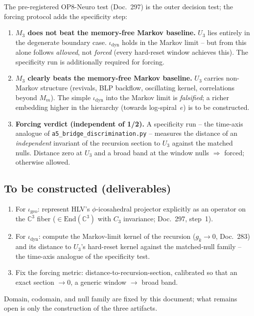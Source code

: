 The pre-registered OP8-Neuro test (Doc.~297) is the outer decision test; the
forcing protocol adds the specificity step:
\begin{enumerate}
  \item \textbf{$M_3$ does not beat the memory-free Markov baseline.} $U_3$
    lies entirely in the degenerate boundary case. $\iota_{\text{dyn}}$
    holds in the Markov limit -- but from this alone follows \emph{allowed},
    not \emph{forced} (every hard-reset window achieves this). The
    specificity run is additionally required for forcing.
  \item \textbf{$M_3$ clearly beats the memory-free Markov baseline.} $U_3$
    carries non-Markov structure (revivals, BLP backflow, oscillating
    kernel, correlations beyond $M_m$). The simple $\iota_{\text{dyn}}$ into
    the Markov limit is \emph{falsified}; a richer embedding higher in the
    hierarchy (towards log-spiral~$e$) is to be constructed.
  \item \textbf{Forcing verdict (independent of 1/2).} A specificity run --
    the time-axis analogue of \texttt{a5\_bridge\_discrimination.py} --
    measures the distance of an \emph{independent} invariant of the recursion
    section to $U_3$ against the matched nulls. Distance zero at $U_3$ and a
    broad band at the window nulls $\Rightarrow$ forced; otherwise allowed.
\end{enumerate}

\subsection*{To be constructed (deliverables)}

\begin{enumerate}
  \item For $\iota_{\text{geo}}$: represent HLV's $\phi$-icosahedral
    projector explicitly as an operator on the $\mathbb{C}^3$ fiber
    ($\in \mathrm{End}(\mathbb{C}^3)$ with $C_3$ invariance; Doc.~297,
    step~1).
  \item For $\iota_{\text{dyn}}$: compute the Markov-limit kernel of the
    recursion ($g_k\to 0$, Doc.~283) and its distance to $U_3$'s hard-reset
    kernel against the matched-null family -- the time-axis analogue of the
    specificity test.
  \item Fix the forcing metric: distance-to-recursion-section, calibrated so
    that an exact section $\to 0$, a generic window $\to$ broad band.
\end{enumerate}
Domain, codomain, and null family are fixed by this document; what remains
open is only the construction of the three artifacts.

